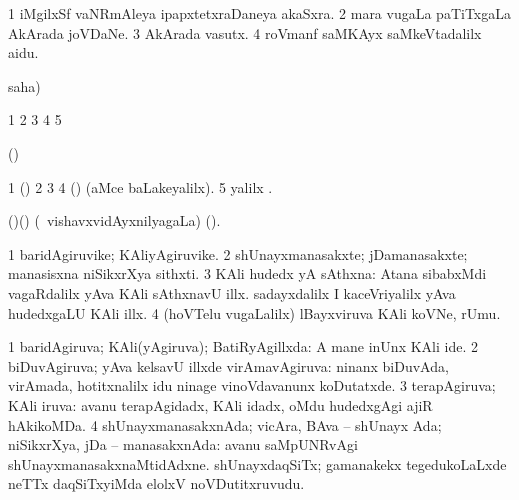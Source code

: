\bentry
{}
\gl{\nA}
\bmng
\bnum
\num{1} iMgilxSf vaNRmAleya ipapxtetxraDaneya akaSxra. 
\num{2} mara \mo vugaLa paTiTxgaLa  AkArada joVDaNe. 
\num{3}  AkArada vasutx. 
\num{4} roVmanf saMKAyx saMkeVtadalilx aidu. 
\enum
\emng
\eentry

\bentry
{}
\gl{\saMkiSx}
\expl{}
\bmng
  saha)  
\emng
\eentry

\bentry
{}
\gl{\saMkiSx}
\expl{}
\bmng
\bnum
\num{1}  
\num{2}  
\num{3}  
\num{4}  
\num{5}  
\enum
\emng
\eentry

\bentry
{}
\gl{\saMkeV}
\expl{}
\bmng
 (\ravi)  
\emng
\eentry

\bentry
{}
\gl{\saMkiSx}
\expl{}
\bmng
\bnum
\num{1} (\ame)  
\num{2}  
\num{3}  
\num{4} (\ame)  (aMce baLakeyalilx). 
\num{5} \UK yalilx . 
\enum
\emng
\eentry

\bentry
{}
\gl{\saMkiSx}
\expl{}
\bmng
\emng
\eentry

\bentry
{}
\gl{\nA}
\expl{}
\bmng
 (\birx)(\AmA) (\kanmu\ vishavxvidAyxnilyagaLa)  (\saMkiSx). 
\emng
\eentry

\bentry
{} 
\gl{\nA}
\bmng
\bnum
\num{1} baridAgiruvike; KAliyAgiruvike. 
\num{2} shUnayxmanasakxte; jDamanasakxte; manasisxna niSikxrXya sithxti. 
\num{3} KAli hudedx yA sAthxna:  Atana sibabxMdi vagaRdalilx yAva KAli sAthxnavU illx.  sadayxdalilx I kaceVriyalilx yAva hudedxgaLU KAli illx. 
\num{4} (hoVTelu \mo vugaLalilx) lBayxviruva KAli koVNe, rUmu. 
\enum
\emng
\eentry

\bentry
{} 
\gl{\gu}
\expl{}
\bmng
\bnum
\num{1} baridAgiruva; KAli(yAgiruva); BatiRyAgillxda:  A mane inUnx KAli ide. 
\num{2} biDuvAgiruva; yAva kelsavU illxde virAmavAgiruva:  ninanx biDuvAda, virAmada, hotitxnalilx idu ninage vinoVdavanunx koDutatxde. 
\num{3} terapAgiruva; KAli iruva:  avanu terapAgidadx, KAli idadx, oMdu hudedxgAgi ajiR hAkikoMDa. 
\num{4} shUnayxmanasakxnAda; vicAra, BAva -- shUnayx Ada; niSikxrXya, jDa -- manasakxnAda:  avanu saMpUNRvAgi shUnayxmanasakxnaMtidAdxne.  shUnayxdaqSiTx; gamanakekx tegedukoLaLxde neTTx daqSiTxyiMda elolxV noVDutitxruvudu. 
\enum
\emng
\eentry

